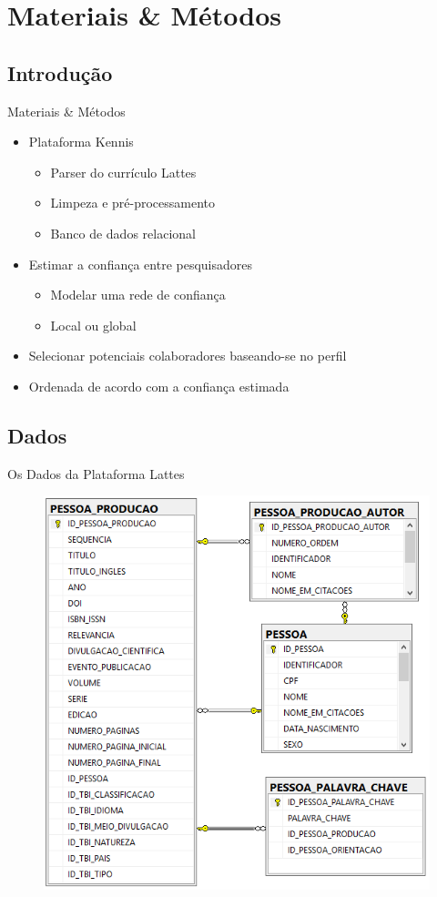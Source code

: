 \documentclass{beamer}
\begin{document}
\section{Materiais \& Métodos}

\subsection{Introdução}

\begin{frame}{Materiais \& Métodos}{}

  \begin{itemize}
    \item Plataforma Kennis
    \begin{itemize}
      \item Parser do currículo Lattes
      \item Limpeza e pré-processamento
      \item Banco de dados relacional
    \end{itemize}
    \item Estimar a confiança entre pesquisadores
    \begin{itemize}
      \item Modelar uma rede de confiança
      \item Local ou global
    \end{itemize}
    \item Selecionar potenciais colaboradores baseando-se no perfil
    \item Ordenada de acordo com a confiança estimada
  \end{itemize}
\end{frame}

\subsection{Dados}

\begin{frame}{Os Dados da Plataforma Lattes}{}

  \begin{figure}[ht]
    \includegraphics[width=.65\textwidth]{database.png}
  \end{figure}

\end{frame}
\end{document}
